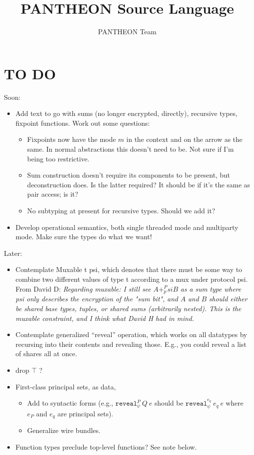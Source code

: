 \documentclass[10pt]{article}
\title{PANTHEON Source Language}
\author{PANTHEON Team}
\newcommand{\kw}[1]{\ensuremath{\mathtt{#1}}}
\newcommand{\ereveal}[4]{\ensuremath{\kw{reveal}^{#1}_{#4}~{#2}~{#3}}}
\begin{document}
\maketitle

\section{TO DO}

Soon:
\begin{itemize}
\item Add text to go with sums (no longer encrypted, directly),
  recursive types, fixpoint functions. Work out some questions:
  \begin{itemize}
    \item Fixpoints now have the mode $m$ in the context and on the
      arrow as the same. In normal abstractions this doesn't need to
      be. Not sure if I'm being too restrictive.
    \item Sum construction doesn't require its components to be
      present, but deconstruction does. Is the latter required? It
      should be if it's the same as pair access; is it?
    \item No subtyping at present for recursive types. Should we add
      it?
    \end{itemize}
\item Develop operational semantics, both single threaded mode and
  multiparty mode. Make sure the types do what we want!
\end{itemize}


Later:
\begin{itemize}
\item Contemplate Muxable t psi, which denotes that there must be some
  way to combine two different values of type t according to a mux
  under protocol psi. From David D: \emph{Regarding muxable: I still see $A +^P_psi B$ as a sum type where psi only describes the encryption of the "sum bit", and $A$ and $B$ should either be shared base types, tuples, or shared sums (arbitrarily nested). This is the muxable constraint, and I think what David H had in mind.}
\item Contemplate generalized ``reveal'' operation, which works on all
  datatypes by recursing into their contents and revealing
  those. E.g., you could reveal a list of shares all at once.
\item drop $\top$ ?
\item First-class principal sets, as data,
  \begin{itemize}
    \item Add to syntactic forms (e.g., $\ereveal{P}{Q}{e}{\psi}$ should be
    $\ereveal{e_q}{e_q}{e}{\psi}$ where $e_P$ and $e_q$ are principal
    sets).
  \item Generalize wire bundles.
  \end{itemize}
\item Function types preclude top-level functions? See note below.
\end{itemize}
\end{document}
